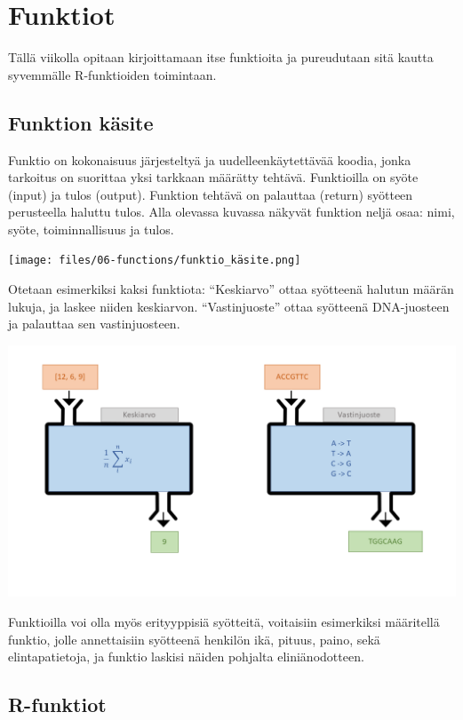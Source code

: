 \documentclass[
]{book}
\begin{document}
\hypertarget{functions}{%
\chapter{Funktiot}\label{functions}}

Tällä viikolla opitaan kirjoittamaan itse funktioita ja pureudutaan sitä kautta syvemmälle R-funktioiden toimintaan.

\hypertarget{funktion-kuxe4site}{%
\section{Funktion käsite}\label{funktion-kuxe4site}}

Funktio on kokonaisuus järjesteltyä ja uudelleenkäytettävää koodia, jonka tarkoitus on suorittaa yksi tarkkaan määrätty tehtävä. Funktioilla on syöte (input) ja tulos (output). Funktion tehtävä on palauttaa (return) syötteen perusteella haluttu tulos. Alla olevassa kuvassa näkyvät funktion neljä osaa: nimi, syöte, toiminnallisuus ja tulos.

\texttt{[image: files/06-functions/funktio\_käsite.png]}

Otetaan esimerkiksi kaksi funktiota: ``Keskiarvo'' ottaa syötteenä halutun määrän lukuja, ja laskee niiden keskiarvon. ``Vastinjuoste'' ottaa syötteenä DNA-juosteen ja palauttaa sen vastinjuosteen.

\includegraphics{files/06-functions/funktio_esimerkit.png}

Funktioilla voi olla myös erityyppisiä syötteitä, voitaisiin esimerkiksi määritellä funktio, jolle annettaisiin syötteenä henkilön ikä, pituus, paino, sekä elintapatietoja, ja funktio laskisi näiden pohjalta eliniänodotteen.

\hypertarget{r-funktiot}{%
\section{R-funktiot}\label{r-funktiot}}
\end{document}
